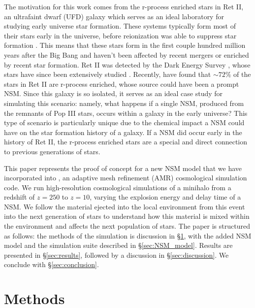 \documentclass[fleqn,usenatbib]{mnras}
\begin{document}
The motivation for this work comes from the r-process enriched stars in Ret II, an ultrafaint dwarf (UFD) galaxy which serves as an ideal laboratory for studying early universe star formation. These systems typically form most of their stars early in the universe, before reionization was able to suppress star formation \citep{Weisz14}. This means that these stars form in the first couple hundred million years after the Big Bang and haven't been affected by recent mergers or enriched by recent star formation. Ret II was detected by the Dark Energy Survey \citep{Bechtol15}, whose stars have since been extensively studied \citep{Simon15, Roederer16, Ji16, Ji22}. Recently, \citet{Ji22} have found that $\sim 72\%$ of the stars in Ret II are r-process enriched, whose source could have been a prompt NSM. Since this galaxy is so isolated, it serves as an ideal case study for simulating this scenario: namely, what happens if a single NSM, produced from the remnants of Pop III stars, occurs within a galaxy in the early universe? This type of scenario is particularly unique due to the chemical impact a NSM could have on the star formation history of a galaxy. If a NSM did occur early in the history of Ret II, the r-process enriched stars are a special and direct connection to previous generations of stars.

This paper represents the proof of concept for a new NSM model that we have incorporated into \enzo{}, an adaptive mesh refinement (AMR) cosmological simulation code. We run high-resolution cosmological simulations of a minihalo from a redshift of $z = 250$ to $z = 10$, varying the explosion energy and delay time of a NSM. We follow the material ejected into the local environment from this event into the next generation of stars to understand how this material is mixed within the environment and affects the next population of stars. The paper is structured as follows: the methods of the simulation is discussion in \S \ref{sec:methods}, with the added NSM model and the simulation suite described in \S \ref{sec:NSM_model}. Results are presented in \S \ref{sec:results}, followed by a discussion in \S \ref{sec:discussion}. We conclude with \S \ref{sec:conclusion}.

\section{Methods} \label{sec:methods}
\end{document}
